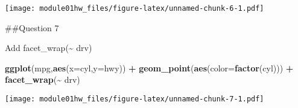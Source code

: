 \documentclass[
]{article}
\newenvironment{Shaded}{\begin{snugshade}}{\end{snugshade}}
\newcommand{\AttributeTok}[1]{\textcolor[rgb]{0.13,0.29,0.53}{#1}}
\newcommand{\FunctionTok}[1]{\textcolor[rgb]{0.13,0.29,0.53}{\textbf{#1}}}
\newcommand{\NormalTok}[1]{#1}
\newcommand{\SpecialCharTok}[1]{\textcolor[rgb]{0.81,0.36,0.00}{\textbf{#1}}}
\begin{document}
\texttt{[image: module01hw\_files/figure-latex/unnamed-chunk-6-1.pdf]}

\#\#Question 7

Add facet\_wrap(\textasciitilde{} drv)

\begin{Shaded}
\begin{Highlighting}[]
\FunctionTok{ggplot}\NormalTok{(mpg,}\FunctionTok{aes}\NormalTok{(}\AttributeTok{x=}\NormalTok{cyl,}\AttributeTok{y=}\NormalTok{hwy)) }\SpecialCharTok{+} \FunctionTok{geom\_point}\NormalTok{(}\FunctionTok{aes}\NormalTok{(}\AttributeTok{color=}\FunctionTok{factor}\NormalTok{(cyl))) }\SpecialCharTok{+} \FunctionTok{facet\_wrap}\NormalTok{(}\SpecialCharTok{\textasciitilde{}}\NormalTok{ drv)}
\end{Highlighting}
\end{Shaded}

\texttt{[image: module01hw\_files/figure-latex/unnamed-chunk-7-1.pdf]}
\end{document}
